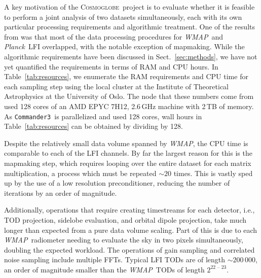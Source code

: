 \documentclass[twocolumn]{../../common/aa}
\def\WMAP{\emph{WMAP}}
\def\Planck{\emph{Planck}}
\def\commanderthree{\texttt{Commander3}}
\newcommand{\cosmoglobe}{\textsc{Cosmoglobe}}
\begin{document}
A key motivation of the \cosmoglobe\ project is to evaluate whether it is feasible to perform a joint analysis of two datasets simultaneously, each with its own particular processing requirements and algorithmic treatment. One of the results from \citet{bp17} was that most of the data processing procedures for  \WMAP\ and \Planck\ LFI overlapped, with the notable exception of mapmaking. While the algorithmic requirements have been discussed in Sect.~\ref{sec:methods}, we have not yet quantified the requirements in terms of RAM and CPU hours. In Table~\ref{tab:resources}, we enumerate the RAM requirements and CPU time for each sampling step using the local cluster at the Institute of Theoretical Astrophysics at the University of Oslo. The node that these numbers come from used 128 cores of an AMD EPYC 7H12, 2.6\,GHz machine with 2\,TB of memory. As \commanderthree\ is parallelized and used 128 cores, wall hours in Table~\ref{tab:resources} can be obtained by dividing by 128.

Despite the relatively small data volume spanned by \WMAP, the CPU time is comparable to each of the LFI channels.  By far the largest reason for this is the mapmaking step, which requires looping over the entire dataset for each matrix multiplication, a process which must be repeated $\sim20$ times. This is vastly sped up by the use of a low resolution preconditioner, reducing the number of iterations by an order of magnitude.


Additionally, operations that require creating timestreams for each detector, i.e., TOD projection, sidelobe evaluation, and orbital dipole projection, take much longer than expected from a pure data volume scaling. Part of this is due to each \WMAP\ radiometer needing to evaluate the sky in two pixels simultaneously, doubling the expected workload. The operations of gain sampling and correlated noise sampling include multiple FFTs. Typical LFI TODs are of length $\sim200\,000$, an order of magnitude smaller than the \WMAP\ TODs of length $2^{\text{22\ --\ 23}}$. 

\end{document}
